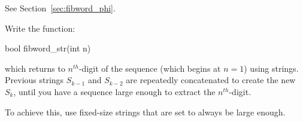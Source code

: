 
See Section~\ref{sec:fibword_phi}.

\begin{exercise}
Write the function:
\begin{codesnippet}
bool fibword_str(int n)
\end{codesnippet}
which returns to $n^{th}$-digit of the sequence (which begins at $n=1$)
using strings. Previous strings
$S_{k-1}$ and $S_{k-2}$
are repeatedly concatenated to create the new $S_k$, until you have a sequence
large enough to extract the $n^{th}$-digit. 

To achieve this, use fixed-size strings that are set to always be large enough.
\end{exercise}
